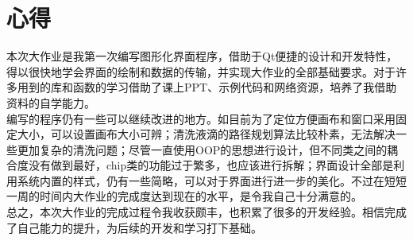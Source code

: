 \documentclass[12pt, a4paper]{article}
\begin{document}
		\section{心得}
			本次大作业是我第一次编写图形化界面程序，借助于Qt便捷的设计和开发特性，得以很快地学会界面的绘制和数据的传输，并实现大作业的全部基础要求。对于许多用到的库和函数的学习借助了课上PPT、示例代码和网络资源，培养了我借助资料的自学能力。 \\ \hspace*{0.8cm}
			编写的程序仍有一些可以继续改进的地方。如目前为了定位方便画布和窗口采用固定大小，可以设置画布大小可辨；清洗液滴的路径规划算法比较朴素，无法解决一些更加复杂的清洗问题；尽管一直使用OOP的思想进行设计，但不同类之间的耦合度没有做到最好，chip类的功能过于繁多，也应该进行拆解；界面设计全部是利用系统内置的样式，仍有一些简略，可以对于界面进行进一步的美化。不过在短短一周的时间内大作业的完成度达到现在的水平，是令我自己十分满意的。 \\ \hspace*{0.8cm}
			总之，本次大作业的完成过程令我收获颇丰，也积累了很多的开发经验。相信完成了自己能力的提升，为后续的开发和学习打下基础。
\end{document}
